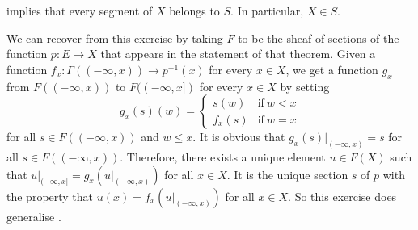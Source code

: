 \documentclass{article}
\begin{document}
\begin{solution}[\ref{exe:x9ewqbv6}]
   implies that every segment of \(X\) belongs to
  \(S\).  In particular, \(X \in S\).

  We can recover  from this exercise by taking
  \(F\) to be the sheaf of sections of the function \(p : E \to X\)
  that appears in the statement of that theorem.  Given a function
  \(f_x : \Gamma((-\infty, x)) \to p^{-1}(x)\) for every \(x \in X\),
  we get a function \(g_x\) from \(F((-\infty,x))\) to
  \(F((-\infty, x])\) for every \(x \in X\) by setting
  \begin{displaymath}
    g_x(s)(w) =
    \begin{cases}
      s(w) & \text{if} ~ w < x \\
      f_x(s) & \text{if} ~ w = x
    \end{cases}
  \end{displaymath}
  for all \(s \in F((-\infty, x))\) and \(w \leq x\).  It is obvious
  that \(g_x(s) \vert_{(-\infty, x)} = s\) for all
  \(s \in F((-\infty, x))\).  Therefore, there exists a unique element
  \(u \in F(X)\) such that
  \(u \vert_{(-\infty, x]} = g_x(u \vert_{(-\infty, x)})\) for all
  \(x \in X\).  It is the unique section \(s\) of \(p\) with the
  property that \(u(x) = f_x(u \vert_{(-\infty, x)})\) for all
  \(x \in X\).  So this exercise does generalise .
\end{solution}
\end{document}
